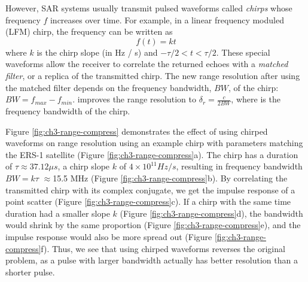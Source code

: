 However, SAR systems usually transmit pulsed waveforms called \emph{chirps} whose frequency $f$ increases over time. For example, in a linear frequency moduled (LFM) chirp, the frequency can be written as 
\begin{equation}
	f(t) = k t
\end{equation}
where $k$ is the chirp slope (in Hz / s) and $-\tau / 2 < t < \tau/2$.
These special waveforms allow the receiver to correlate the returned echoes with a \emph{matched filter}, or a replica of the transmitted chirp. The new range resolution after using the matched filter depends on the frequency bandwidth, $BW$, of the chirp:  $BW = f_{max} - f_{min}$.
improves the range resolution to $\delta_r = \frac{c}{2 BW}$, where is the frequency bandwidth of the chirp. 


Figure \ref{fig:ch3-range-compress} demonstrates the effect of using chirped waveforms on range resolution using an example chirp with parameters matching the ERS-1 satellite (Figure \ref{fig:ch3-range-compress}a).
The chirp has a duration of $\tau \approx 37.12 \mu s$, a chirp slope $k$ of $4 \times 10^{11} Hz / s$, resulting in frequency bandwidth $BW = k \tau$ $\approx$15.5 MHz (Figure \ref{fig:ch3-range-compress}b). By correlating the transmitted chirp with its complex conjugate, we get the impulse response of a point scatter (Figure \ref{fig:ch3-range-compress}c). If a chirp with the same time duration had a smaller slope $k$ (Figure \ref{fig:ch3-range-compress}d), the bandwidth would shrink by the same proportion (Figure \ref{fig:ch3-range-compress}e), and the impulse response would also be more spread out (Figure \ref{fig:ch3-range-compress}f).
Thus, we see that using chirped waveforms reverses the original problem, as a pulse with larger bandwidth actually has better resolution than a shorter pulse.


